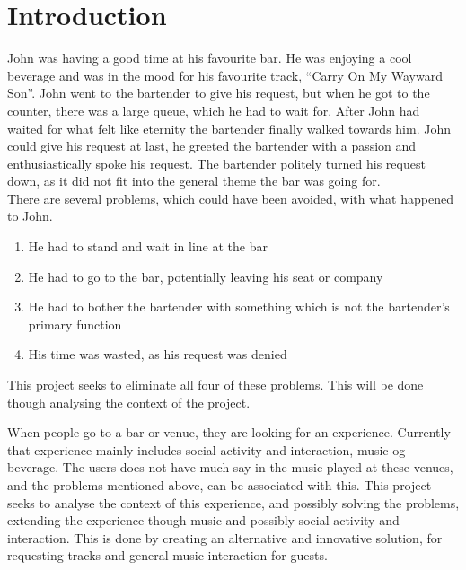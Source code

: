 \chapter{Introduction}
John was having a good time at his favourite bar. He was enjoying a cool beverage and was in the mood for his favourite track, \enquote{Carry On My Wayward Son}. John went to the bartender to give his request, but when he got to the counter, there was a large queue, which he had to wait for. After John had waited for what felt like eternity the bartender finally walked towards him. John could give his request at last, he greeted the bartender with a passion and enthusiastically spoke his request. The bartender politely turned his request down, as it did not fit into the general theme the bar was going for.\\

There are several problems, which could have been avoided, with what happened to John.
\begin{enumerate}
	\item He had to stand and wait in line at the bar
	\item He had to go to the bar, potentially leaving his seat or company
	\item He had to bother the bartender with something which is not the bartender's primary function
	\item His time was wasted, as his request was denied
\end{enumerate}

This project seeks to eliminate all four of these problems. This will be done though analysing the context of the project.

When people go to a bar or venue, they are looking for an experience. Currently that experience mainly includes social activity and interaction, music og beverage. The users does not have much say in the music played at these venues, and the problems mentioned above, can be associated with this. This project seeks to analyse the context of this experience, and possibly solving the problems, extending the experience though music and possibly social activity and interaction. This is done by creating an alternative and innovative solution, for requesting tracks and general music interaction for guests.

